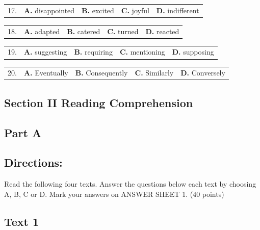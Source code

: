 \documentclass[UTF8,11pt]{ctexart}
\begin{document}
\noindent\begin{tabularx}{\linewidth}{@{}lXXXX@{}}17. & \textbf{A.} disappointed & \textbf{B.} excited & \textbf{C.} joyful & \textbf{D.} indifferent\\\end{tabularx}\par

\noindent\begin{tabularx}{\linewidth}{@{}lXXXX@{}}18. & \textbf{A.} adapted & \textbf{B.} catered & \textbf{C.} turned & \textbf{D.} reacted\\\end{tabularx}\par

\noindent\begin{tabularx}{\linewidth}{@{}lXXXX@{}}19. & \textbf{A.} suggesting & \textbf{B.} requiring & \textbf{C.} mentioning & \textbf{D.} supposing\\\end{tabularx}\par

\noindent\begin{tabularx}{\linewidth}{@{}lXXXX@{}}20. & \textbf{A.} Eventually & \textbf{B.} Consequently & \textbf{C.} Similarly & \textbf{D.} Conversely\\\end{tabularx}\par

\subsection*{\textbf{Section II Reading Comprehension}}


\subsection*{\textbf{Part A}}


\subsection*{\textbf{Directions:}}


Read the following four texts. Answer the questions below each text by choosing A, B, C or D. Mark your answers on ANSWER SHEET 1. (40 points)


\subsection*{\textbf{Text 1}}
\end{document}
